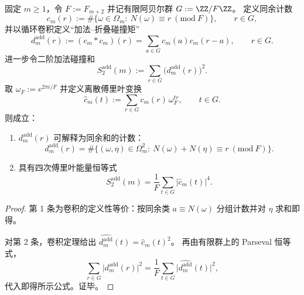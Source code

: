 \begin{theorem}[加法--折叠碰撞矩的卷积化与四次傅里叶能量恒等式]\label{thm:pom-additive-fold-collision-convolution-fourier}
固定 \(m\ge 1\)，令 \(F:=F_{m+2}\) 并记有限阿贝尔群 \(G:=\ZZ/F\ZZ\)。
定义同余计数
\[
c_m(r):=\#\{\omega\in\Omega_m:\ N(\omega)\equiv r\ (\mathrm{mod}\ F)\},
\qquad r\in G,
\]
并以循环卷积定义“加法--折叠碰撞矩”
\[
d_m^{\mathrm{add}}(r):=(c_m*c_m)(r)
=\sum_{a\in G}c_m(a)c_m(r-a),
\qquad r\in G.
\]
进一步令二阶加法碰撞和
\[
S_2^{\mathrm{add}}(m):=\sum_{r\in G}\bigl(d_m^{\mathrm{add}}(r)\bigr)^2.
\]
取 \(\omega_F:=e^{2\pi i/F}\) 并定义离散傅里叶变换
\[
\widehat c_m(t):=\sum_{r\in G}c_m(r)\,\omega_F^{tr},
\qquad t\in G.
\]
则成立：
\begin{enumerate}
  \item \(d_m^{\mathrm{add}}(r)\) 可解释为同余和的计数：
  \[
  d_m^{\mathrm{add}}(r)=\#\{(\omega,\eta)\in\Omega_m^2:\ N(\omega)+N(\eta)\equiv r\ (\mathrm{mod}\ F)\}.
  \]
  \item 具有四次傅里叶能量恒等式
  \[
  \boxed{\;
  S_2^{\mathrm{add}}(m)=\frac{1}{F}\sum_{t\in G}\bigl|\widehat c_m(t)\bigr|^4.\;}
  \]
\end{enumerate}
\end{theorem}
\begin{proof}
第 1 条为卷积的定义性等价：按同余类 \(a\equiv N(\omega)\) 分组计数并对 \(\eta\) 求和即得。
\par
对第 2 条，卷积定理给出 \(\widehat{d_m^{\mathrm{add}}}(t)=\widehat c_m(t)^2\)。
再由有限群上的 Parseval 恒等式，
\[
\sum_{r\in G}\bigl|d_m^{\mathrm{add}}(r)\bigr|^2=\frac{1}{F}\sum_{t\in G}\bigl|\widehat{d_m^{\mathrm{add}}}(t)\bigr|^2,
\]
代入即得所示公式。证毕。
\end{proof}


